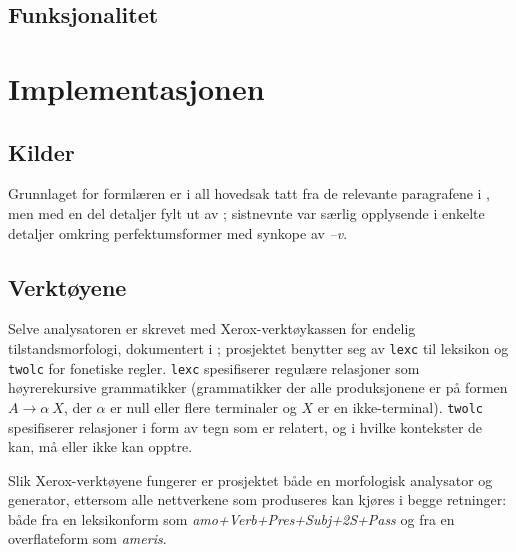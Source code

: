 \documentclass{article}
\begin{document}

\subsection{Funksjonalitet}

\section{Implementasjonen}
\subsection{Kilder} %
Grunnlaget for forml\ae{}ren er i all hovedsak tatt fra de relevante
paragrafene i , men med en del detaljer fylt ut av
; sistnevnte var s\ae{}rlig opplysende i enkelte detaljer
omkring perfektumsformer med synkope av \emph{--v}.

\subsection{Verkt\o{}yene}
Selve analysatoren er skrevet med Xerox-verkt\o{}ykassen for endelig
tilstandsmorfologi, dokumentert i ; prosjektet benytter seg av
\texttt{lexc} til leksikon og \texttt{twolc} for fonetiske regler.
\texttt{lexc} spesifiserer regul\ae{}re relasjoner som h\o{}yrerekursive
grammatikker (grammatikker der alle produksjonene er p\aa{} formen $A \to
\alpha\ X$, der $\alpha$ er null eller flere terminaler og $X$ er en
ikke-terminal). \texttt{twolc} spesifiserer relasjoner i form av tegn som er
relatert, og i hvilke kontekster de kan, m\aa{} eller ikke kan opptre.

Slik Xerox-verkt\o{}yene fungerer er prosjektet b\aa{}de en morfologisk
analysator og generator, ettersom alle nettverkene som produseres kan
kj\o{}res i begge retninger: b\aa{}de fra en leksikonform som
\emph{amo+Verb+Pres+Subj+2S+Pass} og fra en overflateform som \emph{ameris}.

\end{document}
